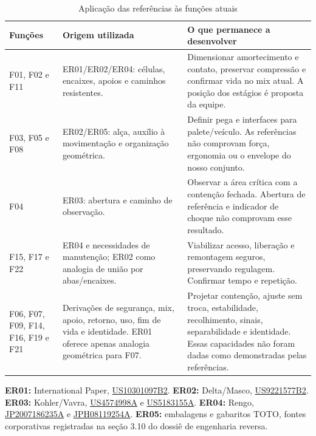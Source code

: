 \begin{table}[H]
\caption{Aplicação das referências às funções atuais}
\centering\small
\begin{tabularx}{\textwidth}{L{4.0cm}YL{7.2cm}}
\toprule\textbf{Funções}&\textbf{Origem utilizada}&\textbf{O que permanece a desenvolver}\\\midrule
F01, F02 e F11&ER01/ER02/ER04: células, encaixes, apoios e caminhos resistentes.&Dimensionar amortecimento e contato, preservar compressão e confirmar vida no mix atual. A posição dos estágios é proposta da equipe.\\
F03, F05 e F08&ER02/ER05: alça, auxílio à movimentação e organização geométrica.&Definir pega e interfaces para palete/veículo. As referências não comprovam força, ergonomia ou o envelope do nosso conjunto.\\
F04&ER03: abertura e caminho de observação.&Observar a área crítica com a contenção fechada. Abertura de referência e indicador de choque não comprovam esse resultado.\\
F15, F17 e F22&ER04 e necessidades de manutenção; ER02 como analogia de união por abas/encaixes.&Viabilizar acesso, liberação e remontagem seguros, preservando regulagem. Confirmar tempo e repetição.\\
F06, F07, F09, F14, F16, F19 e F21&Derivações de segurança, mix, apoio, retorno, uso, fim de vida e identidade. ER01 oferece apenas analogia geométrica para F07.&Projetar contenção, ajuste sem troca, estabilidade, recolhimento, sinais, separabilidade e identidade. Essas capacidades não foram dadas como demonstradas pelas referências.\\\bottomrule
\end{tabularx}
\end{table}

\begin{singlespace}\small\noindent
\textbf{ER01:} International Paper, \href{https://patents.google.com/patent/US10301097B2/en}{US10301097B2}. \textbf{ER02:} Delta/Masco, \href{https://patents.google.com/patent/US9221577B2/en}{US9221577B2}. \textbf{ER03:} Kohler/Vavra, \href{https://patents.google.com/patent/US4574998A/en}{US4574998A} e \href{https://patents.google.com/patent/US5183155A/en}{US5183155A}. \textbf{ER04:} Rengo, \href{https://patents.google.com/patent/JP2007186235A/en}{JP2007186235A} e \href{https://patents.google.com/patent/JPH08119254A/en}{JPH08119254A}. \textbf{ER05:} embalagens e gabaritos TOTO, fontes corporativas registradas na seção 3.10 do dossiê de engenharia reversa.\par
\end{singlespace}

